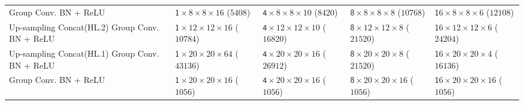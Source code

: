 \documentclass[twocolumn,final]{article}
\newcommand{\cellFormat}{\scriptsize \fontsize{7pt}{0pt}}
\newcommand{\shortTimes}{\! {\times} \!}
\newlength{\cellWidth}   \setlength{\cellWidth}{0.14\columnwidth}
\begin{document}
\begin{table}[ht!]
\begin{tabular}{p{} || p{\cellWidth} p{\cellWidth} p{\cellWidth} p{\cellWidth}}
 \scriptsize \centering Group Conv. \newline BN + ReLU
& \cellFormat $\mathsf 1 \shortTimes 8 \shortTimes 8 \shortTimes 16$  \newline ($5408$)
& \cellFormat $\mathsf 4 \shortTimes 8 \shortTimes 8 \shortTimes 10$  \newline ($8420$)
& \cellFormat $\mathsf 8 \shortTimes 8 \shortTimes 8 \shortTimes  8$  \newline ($10768$)
& \cellFormat $\mathsf 16 \shortTimes 8 \shortTimes 8 \shortTimes 6$ \newline ($12108$)
\\

 \scriptsize \centering Up-sampling \newline Concat(HL.2) \newline Group Conv. \newline BN + ReLU
& \cellFormat $\mathsf 1 \shortTimes 12 \shortTimes 12 \shortTimes 16$  \newline ($10784$)
& \cellFormat $\mathsf 4 \shortTimes 12 \shortTimes 12 \shortTimes 10$  \newline ($16820$)
& \cellFormat $\mathsf 8 \shortTimes 12 \shortTimes 12 \shortTimes  8$   \newline ($21520$)
& \cellFormat $\mathsf 16 \shortTimes 12 \shortTimes 12 \shortTimes 6$  \newline ($24204$)
\\

 \scriptsize \centering Up-sampling \newline Concat(HL.1) \newline Group Conv. \newline BN + ReLU
& \cellFormat $\mathsf 1 \shortTimes 20 \shortTimes 20 \shortTimes 64$  \newline ($43136$)
& \cellFormat $\mathsf 4 \shortTimes 20 \shortTimes 20 \shortTimes 16$  \newline ($26912$)
& \cellFormat $\mathsf 8 \shortTimes 20 \shortTimes 20 \shortTimes  8$  \newline ($21520$)
& \cellFormat $\mathsf 16 \shortTimes 20 \shortTimes 20 \shortTimes 4$ \newline ($16136$)
\\

 \scriptsize \centering Group Conv. \newline BN + ReLU
& \cellFormat $\mathsf 1 \shortTimes 20 \shortTimes 20 \shortTimes  16$  \newline ($1056$)
& \cellFormat $\mathsf 4 \shortTimes 20 \shortTimes 20 \shortTimes  16$  \newline ($1056$)
& \cellFormat $\mathsf 8 \shortTimes 20 \shortTimes 20 \shortTimes  16$  \newline ($1056$)
& \cellFormat $\mathsf 16 \shortTimes 20 \shortTimes 20 \shortTimes 16$  \newline ($1056$)
\\


\end{tabular}
\end{table}
\end{document}
